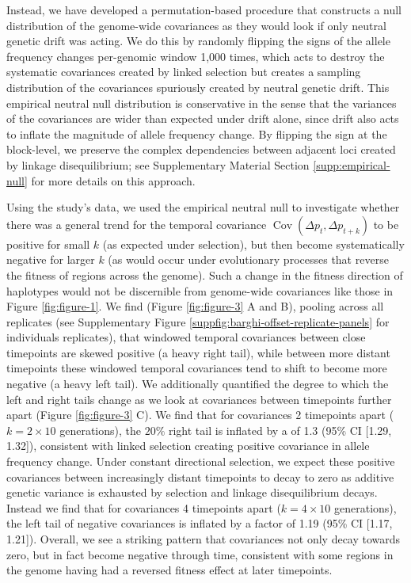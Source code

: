 \documentclass[11pt]{article}
\DeclareMathOperator{\cov}{Cov}
\begin{document}
Instead, we have developed a permutation-based procedure that constructs a null
distribution of the genome-wide covariances as they would look if only neutral
genetic drift was acting. We do this by randomly flipping the signs of the
allele frequency changes per-genomic window 1,000 times, which acts to destroy
the systematic covariances created by linked selection but creates a sampling
distribution of the covariances spuriously created by neutral genetic drift.
This empirical neutral null distribution is conservative in the sense that the
variances of the covariances are wider than expected under drift alone, since
drift also acts to inflate the magnitude of allele frequency change. By
flipping the sign at the block-level, we preserve the complex dependencies
between adjacent loci created by linkage disequilibrium; see Supplementary
Material Section \ref{supp:empirical-null} for more details on this approach.

Using the \textcite{Barghi2019-qy} study's data, we used the empirical neutral
null to investigate whether there was a general trend for the temporal
covariance $\cov(\Delta p_t, \Delta p_{t+k})$ to be positive for small $k$ (as
expected under selection), but then become systematically negative for larger
$k$ (as would occur under evolutionary processes that reverse the fitness of
regions across the genome). Such a change in the fitness direction of
haplotypes would not be discernible from genome-wide covariances like those in
Figure \ref{fig:figure-1}. We find (Figure \ref{fig:figure-3} A and B), pooling
across all replicates (see Supplementary Figure
\ref{suppfig:barghi-offset-replicate-panels} for individuals replicates), that
windowed temporal covariances between close timepoints are skewed positive (a
heavy right tail), while between more distant timepoints these windowed
temporal covariances tend to shift to become more negative (a heavy left tail).
We additionally quantified the degree to which the left and right tails change
as we look at covariances between timepoints further apart (Figure
\ref{fig:figure-3} C). We find that for covariances 2 timepoints apart ($k=2
\times 10$ generations), the $20\%$ right tail is inflated by a of 1.3 (95\% CI
[1.29, 1.32]), consistent with linked selection creating positive covariance in
allele frequency change. Under constant directional selection, we expect these
positive covariances between increasingly distant timepoints to decay to zero
as additive genetic variance is exhausted by selection and linkage
disequilibrium decays. Instead we find that for covariances 4 timepoints apart
($k=4 \times 10$ generations), the left tail of negative covariances is
inflated by a factor of 1.19 (95\% CI [1.17, 1.21]). Overall, we see a striking
pattern that covariances not only decay towards zero, but in fact become
negative through time, consistent with some regions in the genome having had a
reversed fitness effect at later timepoints.
\end{document}
